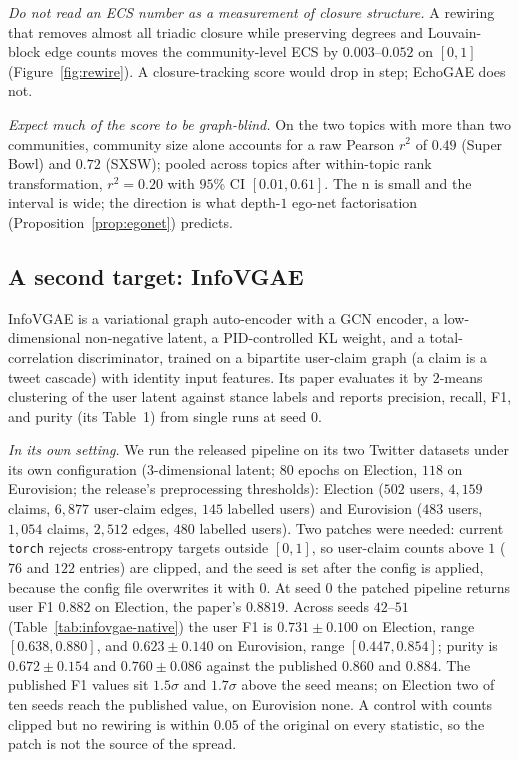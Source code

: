 \documentclass[letterpaper]{article} %
\begin{document}
\emph{Do not read an ECS number as a measurement of closure
structure.} A rewiring that removes almost all triadic closure
while preserving degrees and Louvain-block edge counts moves the
community-level ECS by $0.003$--$0.052$ on $[0, 1]$
(Figure~\ref{fig:rewire}). A closure-tracking score would drop in
step; EchoGAE does not.

\emph{Expect much of the score to be graph-blind.} On the two
topics with more than two communities, community size alone
accounts for a raw Pearson $r^2$ of $0.49$ (Super Bowl) and
$0.72$ (SXSW); pooled across topics after within-topic rank
transformation, $r^2 = 0.20$ with $95\%$ CI $[0.01, 0.61]$. The
n is small and the interval is wide; the direction is what
depth-$1$ ego-net factorisation
(Proposition~\ref{prop:egonet}) predicts.

\subsection{A second target: InfoVGAE}\label{sec:infovgae}

InfoVGAE \citep{Li22InfoVGAE} is a variational graph
auto-encoder with a GCN encoder, a low-dimensional non-negative
latent, a PID-controlled KL weight, and a total-correlation
discriminator, trained on a bipartite user-claim graph (a claim
is a tweet cascade) with identity input features. Its paper
evaluates it by $2$-means clustering of the user latent against
stance labels and reports precision, recall, F1, and purity
(its Table~1) from single runs at seed $0$.

\emph{In its own setting.} We run the released pipeline on its
two Twitter datasets under its own configuration
($3$-dimensional latent; $80$ epochs on Election, $118$ on
Eurovision; the release's preprocessing thresholds): Election
($502$ users, $4{,}159$ claims, $6{,}877$ user-claim edges,
$145$ labelled users) and Eurovision ($483$ users, $1{,}054$
claims, $2{,}512$ edges, $480$ labelled users). Two patches
were needed: current \texttt{torch} rejects cross-entropy
targets outside $[0, 1]$, so user-claim counts above $1$ ($76$
and $122$ entries) are clipped, and the seed is set after the
config is applied, because the config file overwrites it with
$0$. At seed $0$ the patched pipeline returns user F1 $0.882$ on
Election, the paper's $0.8819$. Across seeds $42$--$51$
(Table~\ref{tab:infovgae-native}) the user F1 is
$0.731 \pm 0.100$ on Election, range $[0.638, 0.880]$, and
$0.623 \pm 0.140$ on Eurovision, range $[0.447, 0.854]$;
purity is $0.672 \pm 0.154$ and $0.760 \pm 0.086$ against the
published $0.860$ and $0.884$. The published F1 values sit
$1.5\sigma$ and $1.7\sigma$ above the seed means; on Election
two of ten seeds reach the published value, on Eurovision none.
A control with counts clipped but no rewiring is within $0.05$
of the original on every statistic, so the patch is not the
source of the spread.
\end{document}

